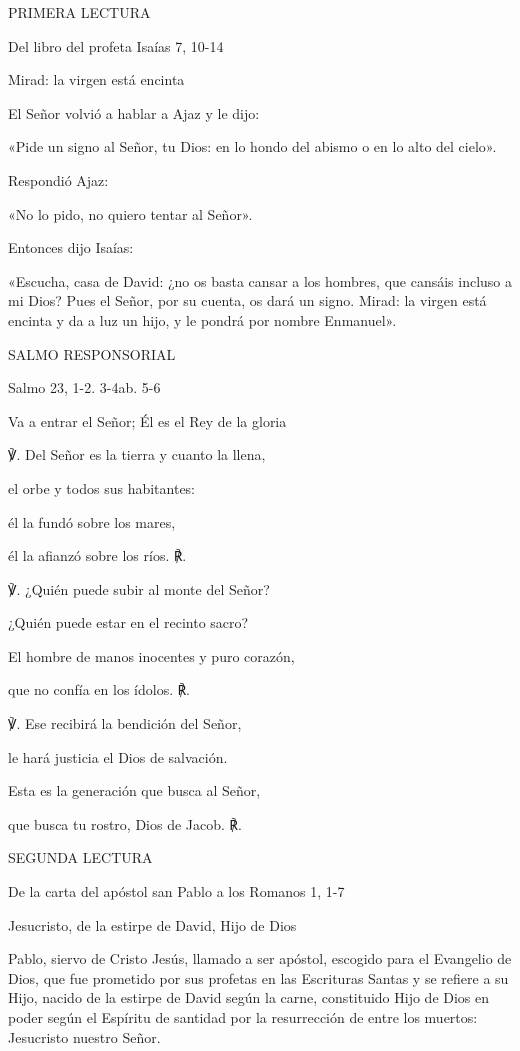 \documentclass[]{article}
\begin{document}
PRIMERA LECTURA

Del libro del profeta Isaías 7, 10-14

Mirad: la virgen está encinta

El Señor volvió a hablar a Ajaz y le dijo:

«Pide un signo al Señor, tu Dios: en lo hondo del abismo o en lo alto
del cielo».

Respondió Ajaz:

«No lo pido, no quiero tentar al Señor».

Entonces dijo Isaías:

«Escucha, casa de David: ¿no os basta cansar a los hombres, que cansáis
incluso a mi Dios? Pues el Señor, por su cuenta, os dará un signo.
Mirad: la virgen está encinta y da a luz un hijo, y le pondrá por nombre
Enmanuel».

SALMO RESPONSORIAL

Salmo 23, 1-2. 3-4ab. 5-6

Va a entrar el Señor; Él es el Rey de la gloria

℣. Del Señor es la tierra y cuanto la llena,

el orbe y todos sus habitantes:

él la fundó sobre los mares,

él la afianzó sobre los ríos. ℟.

℣. ¿Quién puede subir al monte del Señor?

¿Quién puede estar en el recinto sacro?

El hombre de manos inocentes y puro corazón,

que no confía en los ídolos. ℟.

℣. Ese recibirá la bendición del Señor,

le hará justicia el Dios de salvación.

Esta es la generación que busca al Señor,

que busca tu rostro, Dios de Jacob. ℟.

SEGUNDA LECTURA

De la carta del apóstol san Pablo a los Romanos 1, 1-7

Jesucristo, de la estirpe de David, Hijo de Dios

Pablo, siervo de Cristo Jesús, llamado a ser apóstol, escogido para el
Evangelio de Dios, que fue prometido por sus profetas en las Escrituras
Santas y se refiere a su Hijo, nacido de la estirpe de David según la
carne, constituido Hijo de Dios en poder según el Espíritu de santidad
por la resurrección de entre los muertos: Jesucristo nuestro Señor.
\end{document}
